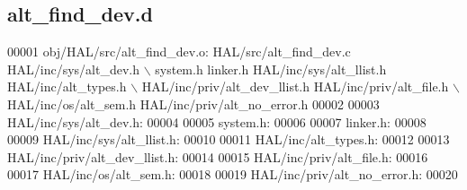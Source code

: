 \subsection{alt\+\_\+find\+\_\+dev.\+d}
\label{alt__find__dev_8d_source}

\begin{DoxyCode}
00001 obj/HAL/src/alt_find_dev.o: HAL/src/alt_find_dev.c HAL/inc/sys/alt_dev.h \(\backslash\)
 system.h linker.h HAL/inc/sys/alt_llist.h HAL/inc/alt\_types.h \(\backslash\)
 HAL/inc/priv/alt_dev_llist.h HAL/inc/priv/alt\_file.h \(\backslash\)
 HAL/inc/os/alt\_sem.h HAL/inc/priv/alt_no_error.h
00002 
00003 HAL/inc/sys/alt_dev.h:
00004 
00005 system.h:
00006 
00007 linker.h:
00008 
00009 HAL/inc/sys/alt_llist.h:
00010 
00011 HAL/inc/alt\_types.h:
00012 
00013 HAL/inc/priv/alt_dev_llist.h:
00014 
00015 HAL/inc/priv/alt\_file.h:
00016 
00017 HAL/inc/os/alt\_sem.h:
00018 
00019 HAL/inc/priv/alt_no_error.h:
00020 \end{DoxyCode}
